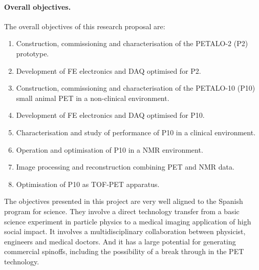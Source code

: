 \paragraph{Overall objectives.}
The overall objectives of this research proposal are:

\begin{enumerate}
\item Construction, commissioning and characterisation of the PETALO-2  (P2) prototype. %
\item Development of FE electronics and DAQ optimised for P2. 
\item Construction, commissioning and characterisation of the PETALO-10 (P10) small animal PET in a non-clinical environment.
\item Development of FE electronics and DAQ optimised for P10.
\item Characterisation and study of performance of P10  in a clinical environment.  
\item Operation and optimisation of  P10 in a NMR environment.
\item Image processing and reconstruction combining PET and NMR data. 
\item Optimisation of  P10 as TOF-PET apparatus.
\end{enumerate}

The objectives presented in this project are very well aligned to the Spanish program for science. They involve a direct technology transfer from a basic science experiment in particle physics to a medical imaging application of high social impact. It involves a multidisciplinary collaboration between physicist, engineers and medical doctors. And it has a large potential for generating commercial spinoffs, including the possibility of a break through in the PET technology.  



